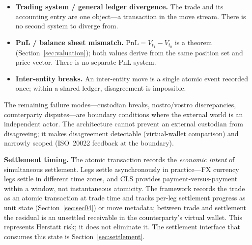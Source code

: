 \begin{itemize}[nosep]
\item \textbf{Trading system / general ledger divergence.} The trade and its accounting entry are one object---a transaction in the move stream. There is no second system to diverge from.
\item \textbf{PnL / balance sheet mismatch.} $\mathrm{PnL} = V_{t_1} - V_{t_0}$ is a theorem (Section~\ref{sec:valuation}); both values derive from the same position set and price vector. There is no separate PnL system.
\item \textbf{Inter-entity breaks.} An inter-entity move is a single atomic event recorded once; within a shared ledger, disagreement is impossible.
\end{itemize}

The remaining failure modes---custodian breaks, nostro/vostro discrepancies, counterparty disputes---are boundary conditions where the external world is an independent actor. The architecture cannot prevent an external custodian from disagreeing; it makes disagreement detectable (virtual-wallet comparison) and narrowly scoped (ISO~20022 feedback at the boundary).

\noindent\textbf{Settlement timing.} The atomic transaction records the \emph{economic intent} of simultaneous settlement. Legs settle asynchronously in practice---FX currency legs settle in different time zones, and CLS provides payment-versus-payment within a window, not instantaneous atomicity. The framework records the trade as an atomic transaction at trade time and tracks per-leg settlement progress as unit state (Section~\ref{sec:sec04}) or move metadata; between trade and settlement the residual is an unsettled receivable in the counterparty's virtual wallet. This represents Herstatt risk; it does not eliminate it. The settlement interface that consumes this state is Section~\ref{sec:settlement}.

\clearpage
